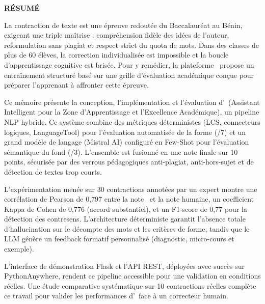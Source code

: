 \thispagestyle{empty}

\vspace*{2cm}

\begin{center}
\Large \textbf{RÉSUMÉ}
\end{center}

\vspace{0.5cm}

La contraction de texte est une épreuve redoutée du Baccalauréat au Bénin, exigeant une triple maîtrise : compréhension fidèle des idées de l'auteur, reformulation sans plagiat et respect strict du quota de mots. Dans des classes de plus de 60 élèves, la correction individualisée est impossible et la boucle d'apprentissage cognitive est brisée. Pour y remédier, la plateforme \AZIZA\ propose un entraînement structuré basé sur une grille d'évaluation académique conçue pour préparer l'apprenant à affronter cette épreuve.

Ce mémoire présente la conception, l'implémentation et l'évaluation d'\AZIZA\ (Assistant Intelligent pour la Zone d'Apprentissage et l'Excellence Académique), un pipeline NLP hybride. Ce système combine des métriques déterministes (LCS, connecteurs logiques, LanguageTool) pour l'évaluation automatisée de la forme (/7) et un grand modèle de langage (Mistral AI) configuré en Few-Shot pour l'évaluation sémantique du fond (/3). L'ensemble est fusionné en une note finale sur 10 points, sécurisée par des verrous pédagogiques anti-plagiat, anti-hors-sujet et de détection de textes trop courts.

L'expérimentation menée sur 30 contractions annotées par un expert montre une corrélation de Pearson de 0,797 entre la note \AZIZA\ et la note humaine, un coefficient Kappa de Cohen de 0,776 (accord substantiel), et un F1-score de 0,77 pour la détection des contresens. L'architecture déterministe garantit l'absence totale d'hallucination sur le décompte des mots et les critères de forme, tandis que le LLM génère un feedback formatif personnalisé (diagnostic, micro-cours et exemple).

L'interface de démonstration Flask et l'API REST, déployées avec succès sur PythonAnywhere, rendent ce pipeline accessible pour une validation en conditions réelles. Une étude comparative systématique sur 10 contractions réelles complète ce travail pour valider les performances d'\AZIZA\ face à un correcteur humain.

